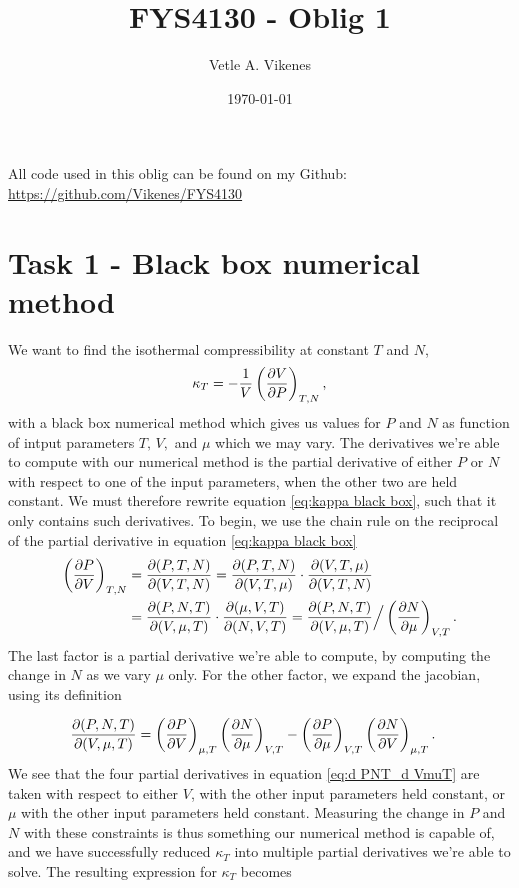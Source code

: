 \documentclass[reprint,english,notitlepage,aps,nobalancelastpage,nofootinbib]{revtex4-1}
\newcommand{\closed}[1]{\left(#1\right)}
\newcommand{\kt}{\kappa_T}
\newcommand{\tmdv}[4]{\closed{\pdv{#1}{#2}}_{#3,#4}}
\newcommand{\jacobian}[2]{\pdv{(#1)}{(#2)}}
\begin{document}
\begin{center}
\title{\Huge FYS4130 - Oblig 1}
\author{\large Vetle A. Vikenes}
\date{\today}
\noaffiliation


\maketitle
\end{center}
\onecolumngrid

All code used in this oblig can be found on my Github: \url{https://github.com/Vikenes/FYS4130}
\\
\section*{\large Task 1 - Black box numerical method}
We want to find the isothermal compressibility at constant $T$ and $N$,
\begin{align} \label{eq:kappa black box}
	\kt = -\frac{1}{V}\closed{\pdv{V}{P}}_{T,N},
\end{align}
with a black box numerical method which gives us values for $P$ and $N$ as function of intput parameters $T,\,V,$ and $\mu$ which we may vary. The derivatives we're able to compute with our numerical method is the partial derivative of either $P$ or $N$ with respect to one of the input parameters, when the other two are held constant. We must therefore rewrite equation \eqref{eq:kappa black box}, such that it only contains such derivatives. To begin, we use the chain rule on the reciprocal of the partial derivative in equation \eqref{eq:kappa black box}
\begin{align*}
	\tmdv{P}{V}{T}{N} &= \jacobian{P,T,N}{V,T,N}=\jacobian{P,T,N}{V,T,\mu}\cdot\jacobian{V,T,\mu}{V,T,N} \\
	&= \jacobian{P,N,T}{V,\mu,T}\cdot\jacobian{\mu,V,T}{N,V,T}=
	\jacobian{P,N,T}{V,\mu,T} \Big/ \tmdv{N}{\mu}{V}{T}.
\end{align*}
The last factor is a partial derivative we're able to compute, by computing the change in $N$ as we vary $\mu$ only. For the other factor, we expand the jacobian, using its definition 

\begin{align}
	\jacobian{P,N,T}{V,\mu,T} &= \tmdv{P}{V}{\mu}{T}\tmdv{N}{\mu}{V}{T}-\tmdv{P}{\mu}{V}{T}\tmdv{N}{V}{\mu}{T}. \label{eq:d PNT_d VmuT}
\end{align}
We see that the four partial derivatives in equation \eqref{eq:d PNT_d VmuT} are taken with respect to either $V$, with the other input parameters held constant, or $\mu$ with the other input parameters held constant. Measuring the change in $P$ and $N$ with these constraints is thus something our numerical method is capable of, and we have successfully reduced $\kt$ into multiple partial derivatives we're able to solve. The resulting expression for $\kt$ becomes  
\end{document}
